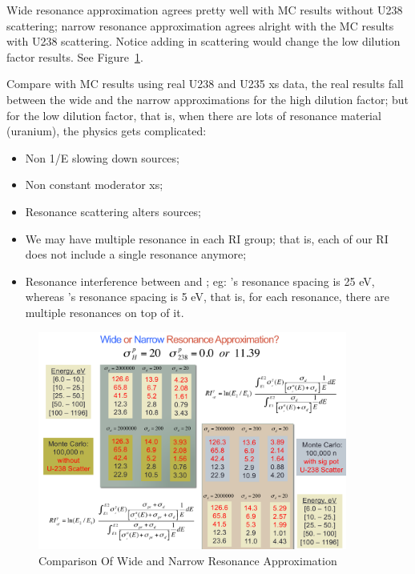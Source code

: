 \documentclass{school-22.211-notes}
\begin{document}
\clearpage
{}
Wide resonance approximation agrees pretty well with MC results without U238 scattering; narrow resonance approximation agrees alright with the MC results with U238 scattering. Notice adding in scattering would change the low dilution factor results. See Figure~\ref{wide-vs-narrow}.

Compare with MC results using real U238 and U235 xs data, the real results fall between the wide and the narrow approximations for the high dilution factor; but for the low dilution factor, that is, when there are lots of resonance material (uranium), the physics gets complicated: 
\begin{itemize}
\item Non 1/E slowing down sources;
\item Non constant moderator xs;
\item Resonance scattering alters sources;
\item We may have multiple resonance in each RI group; that is, each of our RI does not include a single resonance anymore;
\item Resonance interference between  and ; eg: 's resonance spacing is 25 eV, whereas 's resonance spacing is 5 eV, that is, for each  resonance, there are multiple  resonances on top of it. 
\end{itemize}

\begin{figure}
  \centering
  \includegraphics[width=4in]{images/narrow-vs-wide-resonance.png}
  \caption{Comparison Of Wide and Narrow Resonance Approximation} \label{wide-vs-narrow}
\end{figure}
\end{document}
